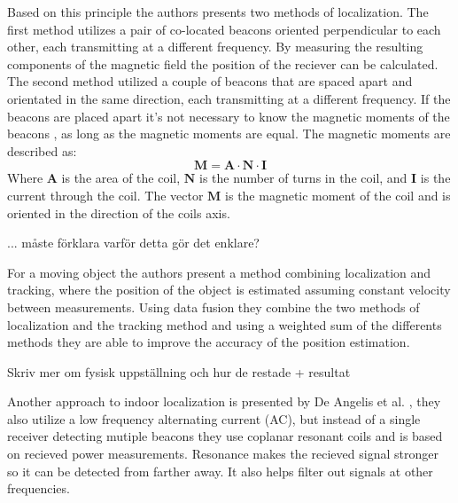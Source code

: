 Based on this principle the authors presents two methods of localization. 
The first method utilizes a pair of co-located beacons oriented perpendicular to each other, each transmitting at a different frequency.
By measuring the resulting components of the magnetic field the position of the reciever can be calculated.
The second method utilized a couple of beacons that are spaced apart and orientated in the same direction, each transmitting at a different frequency.
If the beacons are placed apart it's not necessary to know the magnetic moments of the beacons , as long as the magnetic moments are equal.
The magnetic moments are described as:
\begin{equation}
    \mathbf{M} = \mathbf{A} \cdot \mathbf{N} \cdot \mathbf{I}
\end{equation}
Where $\mathbf{A}$ is the area of the coil, $\mathbf{N}$ is the number of turns in the coil, and $\mathbf{I}$ is the current through the coil.
The vector $\mathbf{M}$ is the magnetic moment of the coil and is oriented in the direction of the coils axis. 

... måste förklara varför detta gör det enklare? 

For a moving object the authors present a method combining localization and tracking, where the position of the object is estimated assuming constant velocity between measurements.
Using data fusion they combine the two methods of localization and the tracking method and using a weighted sum of the differents methods they are able to improve the accuracy of the position estimation. 

Skriv mer om fysisk uppställning och hur de restade + resultat

Another approach to indoor localization is presented by De Angelis et al. \cite{deangelis2015indoor}, they also utilize a low frequency alternating current (AC), but instead of a single receiver detecting mutiple beacons they use coplanar resonant coils and is based on recieved power measurements.
Resonance makes the recieved signal stronger so it can be detected from farther away. It also helps filter out signals at other frequencies.

